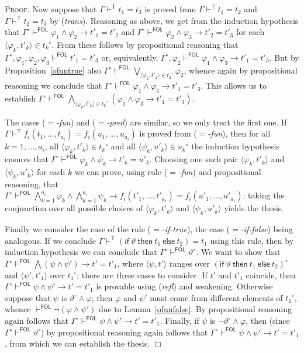 \documentclass{article}
\newenvironment{proof}{\smallskip\textsc{Proof.}}{\hspace*{\fill}$\Box$}
\newcommand{\ifthelse}[3]{\ensuremath{\mathsf{if}\ {#1}\ \mathsf{then}\ {#2}\ \mathsf{else}\ {#3}}}
\newcommand{\ofun}[1]{\ensuremath{{#1}^\circ}}
\newcommand{\pair}[2]{\ensuremath{\langle{#1},{#2}\rangle}}
\newcommand{\myvdash}[1]{\ensuremath{\vdash^{\mathsf{#1}}}}
\begin{document}
\begin{proof}
Now suppose that $\Gamma\myvdash T t_1=t_3$ is proved from
$\Gamma\myvdash T t_1=t_2$ and $\Gamma\myvdash T t_2=t_3$ by
(\emph{trans}).  Reasoning as above, we get from the induction
hypothesis that
$\ofun\Gamma\myvdash{FOL} \varphi_1\wedge\varphi_2\to t'_1=t'_2$ and
$\ofun\Gamma\myvdash{FOL} \varphi_2\wedge\varphi_3\to t'_2=t'_3$ for
each $\pair{\varphi_k}{t'_k}\in\ofun{t_k}$.  From these follows by
propositional reasoning that
$\ofun\Gamma,\varphi_1,\varphi_2,\varphi_3\myvdash{FOL}t'_1=t'_3$ or,
equivalently,
$\ofun\Gamma,\varphi_2\myvdash{FOL}\varphi_1\wedge\varphi_3\to t'_1=t'_3$.
But by Proposition~\ref{ofuntrue} also $\ofun\Gamma\myvdash{FOL}%
\bigvee_{\pair{\varphi_2}{t'_2}\in\ofun{t_2}}\varphi_2$,
whence again by propositional reasoning we conclude that
$\ofun\Gamma\myvdash{FOL}\varphi_1\wedge\varphi_3\to t'_1=t'_3$.  This
allows us to establish
$\ofun\Gamma\myvdash{FOL}\bigwedge_{\pair{\varphi_k}{t'_k}\in\ofun{t_k}}%
\left(\varphi_1\wedge\varphi_3\to t'_1=t'_3\right)$.

The cases (\emph{$=$-fun}) and (\emph{$=$-pred}) are similar, so we only treat
the first one.  If
$\Gamma\myvdash T f_i(t_1,\ldots,t_{a_i})=f_i(u_1,\ldots,u_{a_i})$ is proved
from (\emph{$=$-fun}), then for all $k=1,\ldots,a_i$, all
$\pair{\varphi_k}{t'_k}\in\ofun{t_k}$ and all
$\pair{\psi_k}{u'_k}\in\ofun{u_k}$ the induction hypothesis ensures that
$\ofun\Gamma\myvdash{FOL}\varphi_k\wedge\psi_k\to t'_k=u'_k$.
Choosing one such pair {\pair{\varphi_k}{t'_k}} and
{\pair{\psi_k}{u'_k}} for each $k$ we can prove, using rule
(\emph{$=$-fun}) and propositional reasoning, that $\ofun\Gamma\myvdash{FOL}%
\bigwedge_{k=1}^{a_i}\varphi_k\wedge\bigwedge_{k=1}^{a_i}\psi_k\to
f_i(t'_1,\ldots,t'_{a_i})=f_i(u'_1,\ldots,u'_{a_i})$; taking the conjunction
over all possible choices of {\pair{\varphi_k}{t'_k}} and
{\pair{\psi_k}{u'_k}} yields the thesis.

Finally we consider the case of the rule (\emph{$=$-if-true}), the case
(\emph{$=$-if-false}) being analogous.  If we conclude
$\Gamma\myvdash T(\ifthelse\vartheta{t_1}{t_2})=t_1$ using this rule, then by
induction hypothesis we can conclude that
$\ofun\Gamma\myvdash{FOL}\ofun\vartheta$.
We want to show that
$\ofun\Gamma\myvdash{FOL}\bigwedge(\psi\wedge\psi')\to t'=t'_1$, where
{\pair\psi{t'}} ranges over {\ofun{(\ifthelse\vartheta{t_1}{t_2})}} and
{\pair{\psi'}{t'_1}} over {\ofun{t_1}}; there are three cases to
consider.
If $t'$ and $t'_1$ coincide, then
$\ofun\Gamma\myvdash{FOL}\psi\wedge\psi'\to t'=t'_1$ is provable using
(\emph{refl}) and weakening.
Otherwise suppose that $\psi$ is $\ofun\vartheta\wedge\varphi$; then $\varphi$ and
$\psi'$ must come from different elements of {\ofun{t_1}}, whence
$\myvdash{FOL}\neg(\varphi\wedge\psi')$ due to
Lemma~\ref{ofunfalse}.  By propositional reasoning again follows that
$\ofun\Gamma\myvdash{FOL}\psi\wedge\psi'\to t'=t'_1$.
Finally, if $\psi$ is $\neg\ofun\vartheta\wedge\varphi$, then
(since $\ofun\Gamma\myvdash{FOL}\ofun\vartheta$) by propositional reasoning
again follows that $\ofun\Gamma\myvdash{FOL}\psi\wedge\psi'\to t'=t'_1$,
from which we can establish the thesis.
\end{proof}
\end{document}
